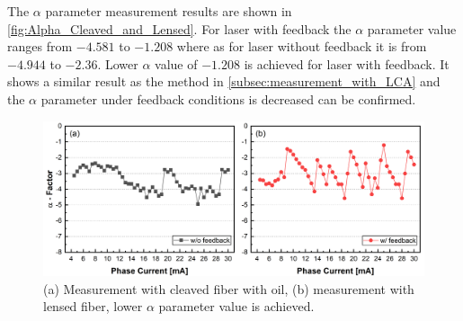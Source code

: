 The $\alpha$ parameter measurement results are shown in \autoref{fig:Alpha_Cleaved_and_Lensed}. For laser with feedback the $\alpha$ parameter value ranges from $-4.581$ to $-1.208$ where as for laser without feedback it is from $-4.944$ to $-2.36$. Lower $\alpha$ value of $-1.208$ is achieved for laser with feedback. It shows a similar result as the method in \autoref{subsec:measurement_with_LCA} and the $\alpha$ parameter under feedback conditions is decreased can be confirmed.
\begin{figure}[ht]
    \centering
    \includegraphics[width=\linewidth]{figures/Alpha_Cleaved_and_Lensed.png}
    \caption{(a) Measurement with cleaved fiber with oil, (b) measurement with lensed fiber, lower $\alpha$ parameter value is achieved.}
    \label{fig:Alpha_Cleaved_and_Lensed}
\end{figure}


